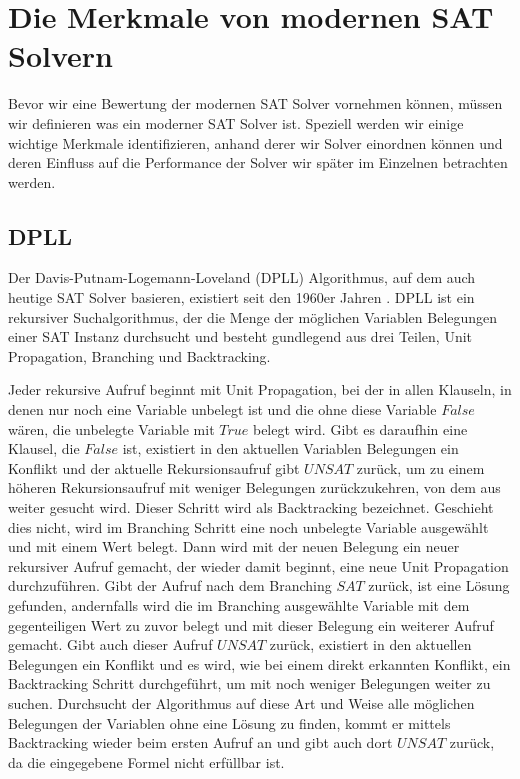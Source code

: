 \documentclass[conference,compsoc,final,a4paper]{IEEEtran}
\begin{document}
\section{Die Merkmale von modernen SAT Solvern}
Bevor wir eine Bewertung der modernen SAT Solver vornehmen können, müssen wir definieren was ein moderner SAT Solver ist. Speziell werden wir einige wichtige Merkmale identifizieren, anhand derer wir Solver einordnen können und deren Einfluss auf die Performance der Solver wir später im Einzelnen betrachten werden.

\subsection{DPLL}
Der Davis-Putnam-Logemann-Loveland (DPLL) Algorithmus, auf dem auch heutige SAT Solver basieren, existiert seit den 1960er Jahren \cites{seed,anatomy_of_modern_sat_solvers}. DPLL ist ein rekursiver Suchalgorithmus, der die Menge der möglichen Variablen Belegungen einer SAT Instanz durchsucht und besteht gundlegend aus drei Teilen, Unit Propagation, Branching und Backtracking. \cite{handbook_of_knowledge_representations}

Jeder rekursive Aufruf beginnt mit Unit Propagation, bei der in allen Klauseln, in denen nur noch eine Variable unbelegt ist und die ohne diese Variable $False$ wären, die unbelegte Variable mit $True$ belegt wird. Gibt es daraufhin eine Klausel, die $False$ ist, existiert in den aktuellen Variablen Belegungen ein Konflikt und der aktuelle Rekursionsaufruf gibt $UNSAT$ zurück, um zu einem höheren Rekursionsaufruf mit weniger Belegungen zurückzukehren, von dem aus weiter gesucht wird. Dieser Schritt wird als Backtracking bezeichnet. Geschieht dies nicht, wird im Branching Schritt eine noch unbelegte Variable ausgewählt und mit einem Wert belegt. Dann wird mit der neuen Belegung ein neuer rekursiver Aufruf gemacht, der wieder damit beginnt, eine neue Unit Propagation durchzuführen. Gibt der Aufruf nach dem Branching $SAT$ zurück, ist eine Lösung gefunden, andernfalls wird die im Branching ausgewählte Variable mit dem gegenteiligen Wert zu zuvor belegt und mit dieser Belegung ein weiterer Aufruf gemacht. Gibt auch dieser Aufruf $UNSAT$ zurück, existiert in den aktuellen Belegungen ein Konflikt und es wird, wie bei einem direkt erkannten Konflikt, ein Backtracking Schritt durchgeführt, um mit noch weniger Belegungen weiter zu suchen. Durchsucht der Algorithmus auf diese Art und Weise alle möglichen Belegungen der Variablen ohne eine Lösung zu finden, kommt er mittels Backtracking wieder beim ersten Aufruf an und gibt auch dort $UNSAT$ zurück, da die eingegebene Formel nicht erfüllbar ist. \cite{handbook_of_knowledge_representations}
\end{document}
